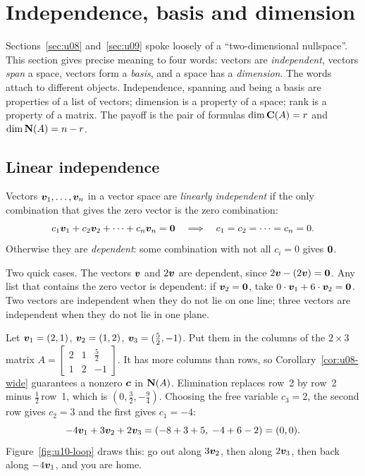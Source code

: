 \section{Independence, basis and dimension}\label{sec:u10}

Sections~\ref{sec:u08} and~\ref{sec:u09} spoke loosely of a ``two-dimensional nullspace''. This
section gives precise meaning to four words: vectors are \emph{independent}, vectors \emph{span} a
space, vectors form a \emph{basis}, and a space has a \emph{dimension}. The words attach to
different objects. Independence, spanning and being a basis are properties of a list of vectors;
dimension is a property of a space; rank is a property of a matrix. The payoff is the pair of
formulas $\dim\mathbf{C}(A)=r$ and $\dim\mathbf{N}(A)=n-r$.

\subsection{Linear independence}

\begin{definition}[Independence]\label{def:u10-indep}
Vectors $\boldsymbol{v}_1,\dots,\boldsymbol{v}_n$ in a vector space are \emph{linearly independent} if the only
combination that gives the zero vector is the zero combination:
\[
c_1\boldsymbol{v}_1+c_2\boldsymbol{v}_2+\dots+c_n\boldsymbol{v}_n=\boldsymbol{0}\quad\Longrightarrow\quad c_1=c_2=\dots=c_n=0.
\]
Otherwise they are \emph{dependent}: some combination with not all $c_i=0$ gives $\boldsymbol{0}$.
\end{definition}

Two quick cases. The vectors $\boldsymbol{v}$ and $2\boldsymbol{v}$ are dependent, since
$2\boldsymbol{v}-(2\boldsymbol{v})=\boldsymbol{0}$. Any list that contains the zero vector is dependent: if
$\boldsymbol{v}_2=\boldsymbol{0}$, take $0\cdot\boldsymbol{v}_1+6\cdot\boldsymbol{v}_2=\boldsymbol{0}$. Two vectors are independent when
they do not lie on one line; three vectors are independent when they do not lie in one plane.

\begin{example}\label{ex:u10-three}
Let $\boldsymbol{v}_1=(2,1)$, $\boldsymbol{v}_2=(1,2)$, $\boldsymbol{v}_3=(\tfrac52,-1)$. Put them in the columns of
the $2\times3$ matrix $A=\begin{bmatrix}2&1&\tfrac52\\1&2&-1\end{bmatrix}$. It has more columns
than rows, so Corollary~\ref{cor:u08-wide} guarantees a nonzero $\boldsymbol{c}$ in $\mathbf{N}(A)$. Elimination
replaces row~2 by row~2 minus $\tfrac12\,$row~1, which is $(0,\tfrac32,-\tfrac94)$. Choosing the
free variable $c_3=2$, the second row gives $c_2=3$ and the first gives $c_1=-4$:
\[
-4\boldsymbol{v}_1+3\boldsymbol{v}_2+2\boldsymbol{v}_3=(-8+3+5,\;-4+6-2)=(0,0).
\]
Figure~\ref{fig:u10-loop} draws this: go out along $3\boldsymbol{v}_2$, then along $2\boldsymbol{v}_3$, then back
along $-4\boldsymbol{v}_1$, and you are home.
\end{example}

